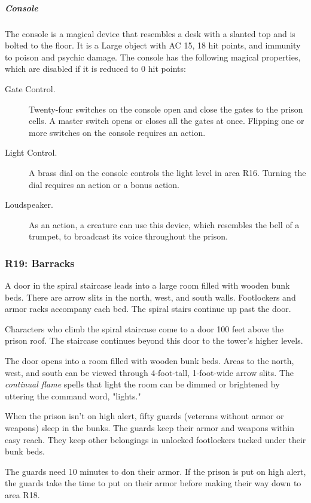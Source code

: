 \documentclass[10pt,a4paper,twoside,bg=print,twocolumn,openany,nodeprecatedcode]{dndbook}
\begin{document}
\subparagraph{Console}
The console is a magical device that resembles a desk with a slanted top and is bolted to the floor. It is a Large object with AC 15, 18 hit points, and immunity to poison and psychic damage. The console has the following magical properties, which are disabled if it is reduced to 0 hit points:


\begin{description}
\item[Gate Control.]
Twenty-four switches on the console open and close the gates to the prison cells. A master switch opens or closes all the gates at once. Flipping one or more switches on the console requires an action.
\item[Light Control.]
A brass dial on the console controls the light level in area R16. Turning the dial requires an action or a bonus action.
\item[Loudspeaker.]
As an action, a creature can use this device, which resembles the bell of a trumpet, to broadcast its voice throughout the prison.
\end{description}

\subsubsection{R19: Barracks}
\begin{DndReadAloud}{}
A door in the spiral staircase leads into a large room filled with wooden bunk beds. There are arrow slits in the north, west, and south walls. Footlockers and armor racks accompany each bed. The spiral stairs continue up past the door.

\end{DndReadAloud}

Characters who climb the spiral staircase come to a door 100 feet above the prison roof. The staircase continues beyond this door to the tower's higher levels.

The door opens into a room filled with wooden bunk beds. Areas to the north, west, and south can be viewed through 4-foot-tall, 1-foot-wide arrow slits. The \textit{continual flame} spells that light the room can be dimmed or brightened by uttering the command word, "lights."

When the prison isn't on high alert, fifty guards (veterans without armor or weapons) sleep in the bunks. The guards keep their armor and weapons within easy reach. They keep other belongings in unlocked footlockers tucked under their bunk beds.

The guards need 10 minutes to don their armor. If the prison is put on high alert, the guards take the time to put on their armor before making their way down to area R18.
\end{document}
